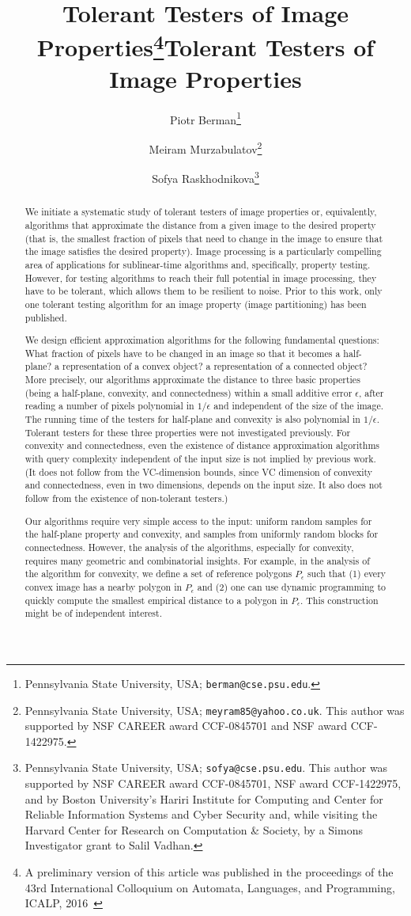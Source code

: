 \documentclass[11pt,english]{article}
\date{}
\title{Tolerant Testers of Image Properties\footnote{A preliminary version of this article was published in the proceedings of the 43rd International Colloquium on Automata, Languages, and Programming, ICALP, 2016~\cite{BMR16icalp}}}
\title{Tolerant Testers of Image Properties}
\author{Piotr Berman\thanks{Pennsylvania State University, USA; {\tt berman@cse.psu.edu}.}\\
\and Meiram Murzabulatov\thanks{Pennsylvania State University, USA; {\tt meyram85@yahoo.co.uk}. This author was supported by NSF CAREER award CCF-0845701 and NSF award CCF-1422975.
}\\
\and Sofya Raskhodnikova\thanks{Pennsylvania State University, USA; {\tt sofya@cse.psu.edu}. This author was supported by NSF CAREER award CCF-0845701, NSF award CCF-1422975, and by Boston University's Hariri Institute for Computing and Center for Reliable Information Systems and Cyber Security and, while visiting the Harvard Center for Research on Computation \& Society, by a Simons Investigator grant to Salil Vadhan.
}
}
\numberwithin{figure}{section}
\newcommand{\eps}{{\epsilon}}
\newcommand{\mydelta}{\epsilon} \newcommand{\bigdelta}{{\epsilon_0}} \newcommand{\dsquares}{d_{\rm squares}}
\begin{document}
\raggedbottom
\setlength{\parskip}{0pt}
\maketitle
\begin{abstract}
We initiate a systematic study of tolerant testers of image properties or, equivalently, algorithms that approximate the distance from a given image to the desired property (that is, the smallest fraction of pixels that need to change in the image to ensure that the image satisfies the desired property). Image processing is a particularly compelling area of applications for sublinear-time algorithms and, specifically, property testing. However, for testing algorithms to reach their full potential in image processing, they have to be tolerant, which allows them to be resilient to noise. Prior to this work, only one tolerant testing algorithm for an image property (image partitioning) has been published.

We design efficient approximation algorithms for the following fundamental questions: What fraction of pixels have to be changed in an image so that it becomes a half-plane? a representation of a convex object? a representation of a connected object? More precisely, our algorithms approximate the distance to three basic properties (being a half-plane, convexity, and connectedness) within a small additive error $\eps$, after reading a number of pixels polynomial in $1/\eps$ and independent of the size of the image. The running time of the testers for half-plane and convexity is also polynomial in $1/\eps$.
Tolerant testers for these three properties were not investigated previously. For convexity and connectedness, even the existence of distance approximation algorithms with query complexity independent of the input size is not implied by previous work. (It does not follow from the VC-dimension bounds, since VC dimension of convexity and connectedness, even in two dimensions, depends on the input size. It also does not follow from the existence of non-tolerant testers.)

Our algorithms require very simple access to the input: uniform random samples for the half-plane property and convexity, and samples from uniformly random blocks for connectedness. However, the analysis of the algorithms, especially for convexity, requires many geometric and combinatorial insights. For example, in the analysis of the algorithm for convexity, we define a set of reference polygons  $P_\mydelta$ such that (1) every convex image has a nearby polygon in $P_\mydelta$ and (2) one can use dynamic programming to quickly compute the smallest empirical distance to a polygon in $P_\mydelta$. This construction might be of independent interest.

\end{abstract}
\end{document}

